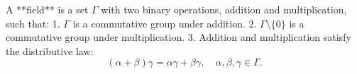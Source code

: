 A **field** is a set $\Gamma$ with two binary operations, addition and multiplication, such that:
1. $\Gamma$ is a commutative group under addition.
2. $\Gamma \setminus \{0\}$ is a commutative group under multiplication.
3. Addition and multiplication satisfy the distributive law:
$$(\alpha + \beta)\gamma = \alpha\gamma + \beta\gamma, \quad \alpha, \beta, \gamma \in \Gamma.$$
